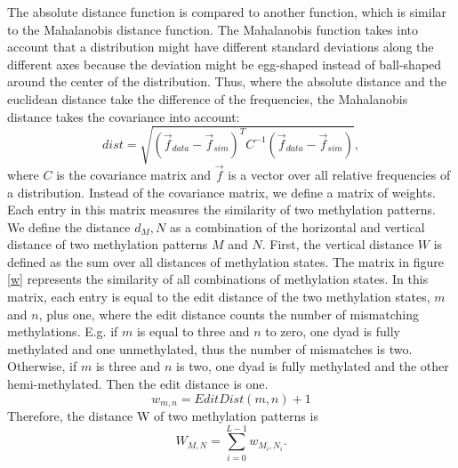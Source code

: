 The absolute distance function is compared to another function, which is similar to the Mahalanobis distance function. The Mahalanobis function takes into account that a distribution might have different standard deviations along the different axes because the deviation might be egg-shaped instead of ball-shaped around the center of the distribution. Thus, where the absolute distance and the euclidean distance take the difference of the frequencies, the Mahalanobis distance takes the covariance into account:
\[dist = \sqrt{(\vec{f}_{data}-\vec{f}_{sim})^T C^{-1} (\vec{f}_{data}-\vec{f}_{sim})},\]
where $C$ is the covariance matrix and $\vec{f}$ is a vector over all relative frequencies of a distribution.\newline
Instead of the covariance matrix, we define a matrix of weights. Each entry in this matrix measures the similarity of two methylation patterns. We define the distance $d_M,N$ as a combination of the horizontal and vertical distance of two methylation patterns $M$ and $N$.\newline
First, the vertical distance $W$ is defined as the sum over all distances of methylation states. The matrix in figure \ref{w} represents the similarity of all combinations of methylation states. In this matrix, each entry is equal to the edit distance of the two methylation states, $m$ and $n$, plus one, where the edit distance counts the number of mismatching methylations. E.g. if $m$ is equal to three and $n$ to zero, one dyad is fully methylated and one unmethylated, thus the number of mismatches is two. Otherwise, if $m$ is three and $n$ is two, one dyad is fully methylated and the other hemi-methylated. Then the edit distance is one.
\[w_{m,n} = EditDist(m,n)+1\]
Therefore, the distance W of two methylation patterns is
\[W_{M,N} = \sum^{L-1}_{i=0}{w_{M_i,N_i}}.\]

